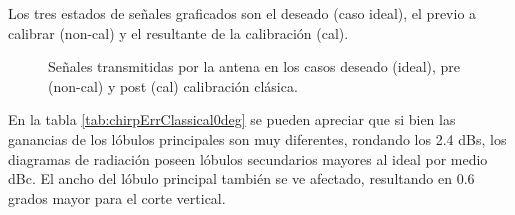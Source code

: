 Los tres estados de señales graficados son el deseado (caso ideal), el previo a calibrar (non-cal) y el resultante de la
calibración (cal).
\begin{figure}[H]
	\centering

	\caption{Señales transmitidas por la antena en los casos deseado (ideal), pre (non-cal) y post (cal) calibración clásica.}
	\label{fig:chirpErrClassical0deg}
\end{figure}

En la tabla \ref{tab:chirpErrClassical0deg} se pueden apreciar que si bien las ganancias de los lóbulos principales son muy 
diferentes, rondando los 2.4 dBs, los diagramas de radiación poseen lóbulos secundarios mayores al ideal por medio dBc. El 
ancho del lóbulo principal también se ve afectado, resultando en 0.6 grados mayor para el corte vertical.

